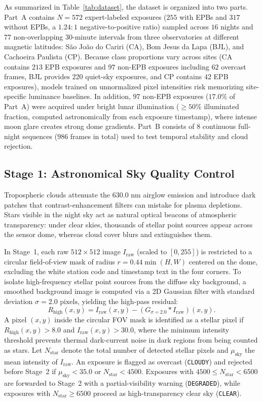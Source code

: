 As summarized in Table~\ref{tab:dataset}, the dataset is organized into two parts. Part~A contains $N = 572$ expert-labeled exposures ($255$ with EPBs and $317$ without EPBs, a $1.24:1$ negative-to-positive ratio) sampled across $16$ nights and $77$ non-overlapping $30\text{-minute}$ intervals from three observatories at different magnetic latitudes: São João do Cariri (CA), Bom Jesus da Lapa (BJL), and Cachoeira Paulista (CP). Because class proportions vary across sites (CA contains $213$ EPB exposures and $97$ non-EPB exposures including $62$ overcast frames, BJL provides $220$ quiet-sky exposures, and CP contains $42$ EPB exposures), models trained on unnormalized pixel intensities risk memorizing site-specific luminance baselines. In addition, $97$ non-EPB exposures ($17.0\%$ of Part~A) were acquired under bright lunar illumination ($\ge 50\%$ illuminated fraction, computed astronomically from each exposure timestamp), where intense moon glare creates strong dome gradients. Part~B consists of $8$ continuous full-night sequences ($986$ frames in total) used to test temporal stability and cloud rejection.

\subsection{Stage 1: Astronomical Sky Quality Control}

Tropospheric clouds attenuate the $630.0\text{ nm}$ airglow emission and introduce dark patches that contrast-enhancement filters can mistake for plasma depletions. Stars visible in the night sky act as natural optical beacons of atmospheric transparency: under clear skies, thousands of stellar point sources appear across the sensor dome, whereas cloud cover blurs and extinguishes them.

In Stage~1, each raw $512 \times 512$ image $I_{\text{raw}}$ (scaled to $[0, 255]$) is restricted to a circular field-of-view mask of radius $r = 0.44 \min(H, W)$ centered on the dome, excluding the white station code and timestamp text in the four corners. To isolate high-frequency stellar point sources from the diffuse sky background, a smoothed background image is computed via a 2D Gaussian filter with standard deviation $\sigma = 2.0\text{ pixels}$, yielding the high-pass residual:
\begin{equation}\label{eq:star_residual}
    R_{\text{high}}(x, y) = I_{\text{raw}}(x, y) - (G_{\sigma=2.0} * I_{\text{raw}})(x, y).
\end{equation}
A pixel $(x, y)$ inside the circular FOV mask is identified as a stellar pixel if $R_{\text{high}}(x, y) > 8.0$ and $I_{\text{raw}}(x, y) > 30.0$, where the minimum intensity threshold prevents thermal dark-current noise in dark regions from being counted as stars. Let $N_{\text{star}}$ denote the total number of detected stellar pixels and $\mu_{\text{sky}}$ the mean intensity of $I_{\text{raw}}$. An exposure is flagged as overcast (\texttt{CLOUDY}) and rejected before Stage~2 if $\mu_{\text{sky}} < 35.0$ or $N_{\text{star}} < 4500$. Exposures with $4500 \le N_{\text{star}} < 6500$ are forwarded to Stage~2 with a partial-visibility warning (\texttt{DEGRADED}), while exposures with $N_{\text{star}} \ge 6500$ proceed as high-transparency clear sky (\texttt{CLEAR}).

